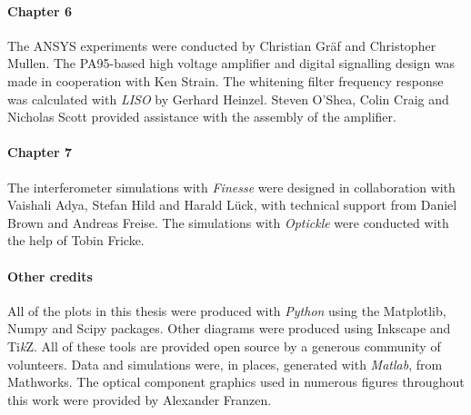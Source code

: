 \paragraph{Chapter 6}
The ANSYS experiments were conducted by Christian Gr\"{a}f and Christopher Mullen. The PA95-based high voltage amplifier and digital signalling design was made in cooperation with Ken Strain. The whitening filter frequency response was calculated with \emph{LISO} by Gerhard Heinzel. Steven O'Shea, Colin Craig and Nicholas Scott provided assistance with the assembly of the amplifier.

\paragraph{Chapter 7}
The interferometer simulations with \emph{Finesse} were designed in collaboration with Vaishali Adya, Stefan Hild and Harald L\"{u}ck, with technical support from Daniel Brown and Andreas Freise. The simulations with \emph{Optickle} were conducted with the help of Tobin Fricke.

\paragraph{Other credits}
All of the plots in this thesis were produced with \emph{Python} using the Matplotlib, Numpy and Scipy packages. Other diagrams were produced using Inkscape and Ti\emph{k}Z. All of these tools are provided open source by a generous community of volunteers. Data and simulations were, in places, generated with \emph{Matlab}, from Mathworks. The optical component graphics used in numerous figures throughout this work were provided by Alexander Franzen.